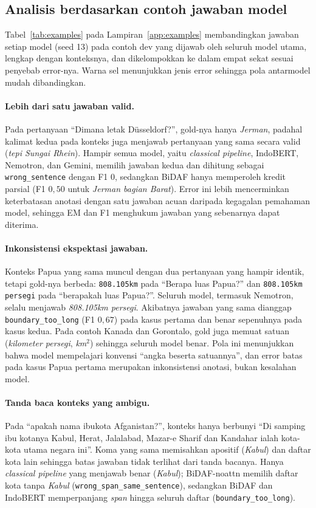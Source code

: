 \documentclass[11pt,a4paper]{article}
\begin{document}
\subsection{Analisis berdasarkan contoh jawaban model}
\label{sec:ea-examples}
Tabel~\ref{tab:examples} pada Lampiran~\ref{app:examples} membandingkan jawaban setiap model (seed 13) pada contoh dev
yang dijawab oleh seluruh model utama, lengkap dengan konteksnya, dan dikelompokkan ke dalam empat sekat sesuai penyebab
error-nya. Warna sel menunjukkan jenis error sehingga pola antarmodel mudah dibandingkan.

\paragraph{Lebih dari satu jawaban valid.}
Pada pertanyaan ``Dimana letak Düsseldorf?'', gold-nya hanya \textit{Jerman}, padahal kalimat kedua pada konteks juga
menjawab pertanyaan yang sama secara valid (\textit{tepi Sungai Rhein}). Hampir semua model, yaitu \textit{classical
pipeline}, IndoBERT, Nemotron, dan Gemini, memilih jawaban kedua dan dihitung sebagai \texttt{wrong\_sentence} dengan
F1 $0$, sedangkan BiDAF hanya memperoleh kredit parsial (F1 $0{,}50$ untuk \textit{Jerman bagian Barat}). Error ini
lebih mencerminkan keterbatasan anotasi dengan satu jawaban acuan daripada kegagalan pemahaman model, sehingga EM dan F1
menghukum jawaban yang sebenarnya dapat diterima.

\paragraph{Inkonsistensi ekspektasi jawaban.}
Konteks Papua yang sama muncul dengan dua pertanyaan yang hampir identik, tetapi gold-nya berbeda: \texttt{808.105km}
pada ``Berapa luas Papua?'' dan \texttt{808.105km persegi} pada ``berapakah luas Papua?''. Seluruh model, termasuk
Nemotron, selalu menjawab \textit{808.105km persegi}. Akibatnya jawaban yang sama dianggap \texttt{boundary\_too\_long}
(F1 $0{,}67$) pada kasus pertama dan benar sepenuhnya pada kasus kedua. Pada contoh Kanada dan Gorontalo, gold juga
memuat satuan (\textit{kilometer persegi}, \textit{km$^2$}) sehingga seluruh model benar. Pola ini menunjukkan bahwa
model mempelajari konvensi ``angka beserta satuannya'', dan error batas pada kasus Papua pertama merupakan
inkonsistensi anotasi, bukan kesalahan model.

\paragraph{Tanda baca konteks yang ambigu.}
Pada ``apakah nama ibukota Afganistan?'', konteks hanya berbunyi ``Di samping ibu kotanya Kabul, Herat, Jalalabad,
Mazar-e Sharif dan Kandahar ialah kota-kota utama negara ini''. Koma yang sama memisahkan apositif (\textit{Kabul}) dan
daftar kota lain sehingga batas jawaban tidak terlihat dari tanda bacanya. Hanya \textit{classical pipeline} yang
menjawab benar (\textit{Kabul}); BiDAF-noattn memilih daftar kota tanpa \textit{Kabul} (\texttt{wrong\_span\_same\_sentence}),
sedangkan BiDAF dan IndoBERT memperpanjang \textit{span} hingga seluruh daftar (\texttt{boundary\_too\_long}).
\end{document}
